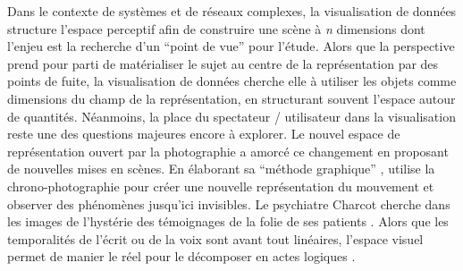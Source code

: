Dans le contexte de systèmes et de réseaux complexes, la visualisation de données structure l{\textquoteright}espace perceptif afin de construire une scène à \textit{n }dimensions dont l{\textquoteright}enjeu est la recherche d{\textquoteright}un {\textquotedblleft}point de vue{\textquotedblright} pour l{\textquoteright}étude\textit{. }Alors que la perspective prend pour parti de matérialiser le sujet au centre de la représentation par des points de fuite, la visualisation de données cherche elle à utiliser les objets comme dimensions du champ de la représentation, en structurant souvent l{\textquoteright}espace autour de quantités. Néanmoins, la place du spectateur / utilisateur dans la visualisation reste une des questions majeures encore à explorer. Le nouvel espace de représentation ouvert par la photographie a amorcé ce changement en proposant de nouvelles mises en scènes. En élaborant sa {\textquotedblleft}méthode graphique{\textquotedblright} , \cite{Marey1885} utilise la chrono-photographie pour créer une nouvelle représentation du mouvement et observer des phénomènes jusqu{\textquoteright}ici invisibles. Le psychiatre Charcot cherche dans les images de l{\textquoteright}hystérie des témoignages de la folie de ses patients \citep{DidiHuberman2012}. Alors que les temporalités de l{\textquoteright}écrit ou de la voix sont avant tout linéaires, l{\textquoteright}espace visuel permet de manier le réel pour le décomposer en actes logiques \citep{Lafont2010}. 


